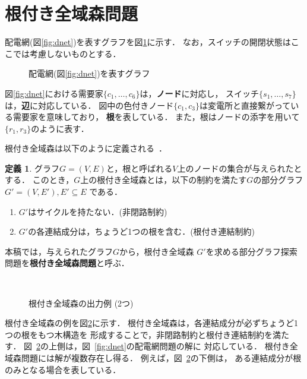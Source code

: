﻿\section{根付き全域森問題}\label{chap:problem}

配電網(図\ref{fig:dnet})を表すグラフを図\ref{fig:dnetgraph}に示す．
なお，スイッチの開閉状態はここでは考慮しないものとする．

\begin{figure}[htbp]
 \centering
 \scalebox{0.8}{}
 \caption{配電網(図\ref{fig:dnet})を表すグラフ}
 \label{fig:dnetgraph}
\end{figure}

図\ref{fig:dnet}における需要家$\{c_1,\ldots,c_6\}$は，\textbf{ノード}に対応し，
スイッチ$\{s_1,\ldots,s_7\}$は，\textbf{辺}に対応している．
図中の色付きノード$\{c_1,c_3\}$は変電所と直接繋がっている需要家を意味しており，
\textbf{根}を表している．
また，根はノードの添字を用いて$\{r_1,r_3\}$のように表す．


\theoremstyle{definition}
\newtheorem*{definition*}{定義}

根付き全域森は以下のように定義される~\cite{Minato:dnet:netuki}．
\begin{definition*}
  グラフ$G=(V,E)$と，根と呼ばれる$V$上のノードの集合が与えられたとする．
  このとき，$G$上の根付き全域森とは，以下の制約を満たす$G$の部分グラフ
  $G'=(V,E'), E' \subseteq E$ である．
  \begin{enumerate}
  \item $G'$はサイクルを持たない．(非閉路制約)
  \item $G'$の各連結成分は，ちょうど1つの根を含む．(根付き連結制約)
  \end{enumerate}
本稿では，与えられたグラフ$G$から，根付き全域森
$G'$を求める部分グラフ探索問題を\textbf{根付き全域森問題}と呼ぶ．
\end{definition*}

\begin{figure}[htbp]
  \centering
  \scalebox{0.8}{}\\[1em]
  \scalebox{0.8}{}
  \caption{根付き全域森の出力例 (2つ)}
  \label{fig:netuki}
\end{figure}

根付き全域森の例を図\ref{fig:netuki}に示す．
根付き全域森は，各連結成分が必ずちょうど1つの根をもつ木構造を
形成することで，非閉路制約と根付き連結制約を満たす．
図~\ref{fig:netuki}の上側は，図~\ref{fig:dnet}の配電網問題の解に
対応している．
根付き全域森問題には解が複数存在し得る．
例えば，図~\ref{fig:netuki}の下側は，
ある連結成分が根のみとなる場合を表している．

